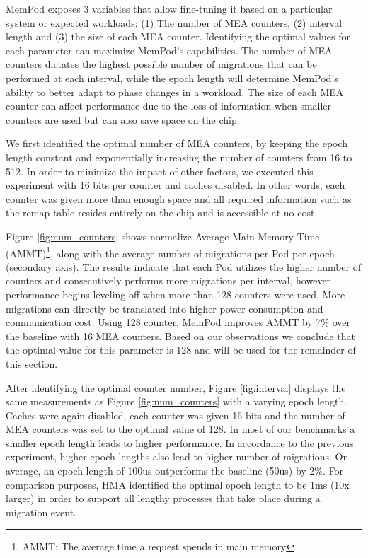 MemPod exposes 3 variables that allow fine-tuning it based on a particular system or expected workloads: (1) The number of MEA counters, (2) interval length and (3) the size of each MEA counter. Identifying the optimal values for each parameter can maximize MemPod's capabilities. The number of MEA counters dictates the highest possible number of migrations that can be performed at each interval, while the epoch length will determine MemPod's ability to better adapt to phase changes in a workload. The size of each MEA counter can affect performance due to the loss of information when smaller counters are used but can also save space on the chip.

We first identified the optimal number of MEA counters, by keeping the epoch length constant and exponentially increasing the number of counters from 16 to 512. In order to minimize the impact of other factors, we executed this experiment with 16 bits per counter and caches disabled. In other words, each counter was given more than enough space and all required information such as the remap table resides entirely on the chip and is accessible at no cost. 

Figure \ref{fig:num_counters} shows normalize Average Main Memory Time (AMMT)\footnote{AMMT: The average time a request spends in main memory}, along with the average number of migrations per Pod per epoch (secondary axis). The results indicate that each Pod utilizes the higher number of counters and consecutively performs more migrations per interval, however performance begins leveling off when more than 128 counters were used. More migrations can directly be translated into higher power consumption and communication cost. Using 128 counter, MemPod improves AMMT by 7\% over the baseline with 16 MEA counters. Based on our observations we conclude that the optimal value for this parameter is 128 and will be used for the remainder of this section.

After identifying the optimal counter number, Figure \ref{fig:interval} displays the same measurements as Figure \ref{fig:num_counters} with a varying epoch length. Caches were again disabled, each counter was given 16 bits and the number of MEA counters was set to the optimal value of 128. In most of our benchmarks a smaller epoch length leads to higher performance. In accordance to the previous experiment, higher epoch lengths also lead to higher number of migrations. On average, an epoch length of 100us outperforms the baseline (50us) by 2\%. For comparison purposes, HMA \cite{meswani-HPCA21} identified the optimal epoch length to be 1ms (10x larger) in order to support all lengthy processes that take place during a migration event.

